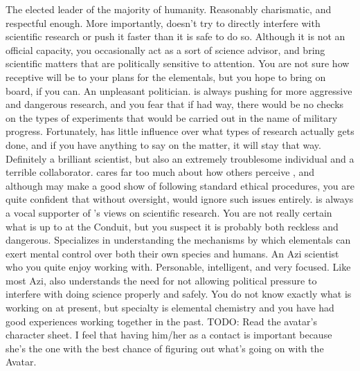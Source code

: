 \documentclass[char]{elementals}
\begin{document}
\begin{contacts}
  \contact{\cLeader{}} The elected leader of the majority of humanity. Reasonably charismatic, and respectful enough. More importantly, \cLeader{\they} doesn't try to directly interfere with scientific research or push it faster than it is safe to do so. Although it is not an official capacity, you occasionally act as a sort of science advisor, and bring scientific matters that are politically sensitive to \cLeader{\their} attention. You are not sure how receptive \cLeader{\they} will be to your plans for the elementals, but you hope to bring \cLeader{\them} on board, if you can.
	\contact{\cDema{}} An unpleasant politician. \cDema{\They} is always pushing for more aggressive and dangerous research, and you fear that if \cDema{\they} had \cDema{\their} way, there would be no checks on the types of experiments that would be carried out in the name of military progress. Fortunately, \cDema{\they} has little influence over what types of research actually gets done, and if you have anything to say on the matter, it will stay that way.
	\contact{\cMS{}} Definitely a brilliant scientist, but also an extremely troublesome individual and a terrible collaborator. \cMS{\They} cares far too much about how others perceive \cMS{\them}, and although \cMS{\they} may make a good show of following standard ethical procedures, you are quite confident that without oversight, \cMS{\they} would ignore such issues entirely. \cMS{\They} is always a vocal supporter of \cDema{}'s views on scientific research. You are not really certain what \cMS{\they} is up to at the Conduit, but you suspect it is probably both reckless and dangerous. Specializes in understanding the mechanisms by which elementals can exert mental control over both their own species and humans.
	\contact{\cScientist{}} An Azi scientist who you quite enjoy working with. Personable, intelligent, and very focused. Like most Azi, \cScientist{\they} also understands the need for not allowing political pressure to interfere with doing science properly and safely. You do not know exactly what \cScientist{\they} is working on at present, but \cScientist{\their} specialty is elemental chemistry and you have had good experiences working together in the past.
  \contact{\cAvatar{}} TODO: Read the avatar's character sheet. I feel that having him/her as a contact is important because she's the one with the best chance of figuring out what's going on with the Avatar.
\end{contacts}
\end{document}
